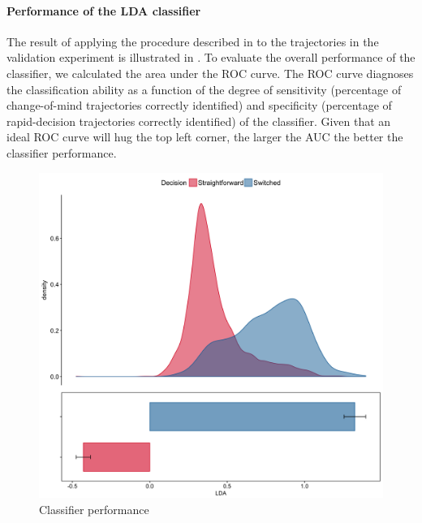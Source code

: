 \documentclass{article}
\begin{document}
\paragraph{Performance of the LDA classifier}
The result of applying the procedure described in  to the trajectories in the validation experiment is illustrated in . 
To evaluate the overall performance of the classifier, we calculated the area under the ROC curve.  
The ROC curve diagnoses the classification ability as a function of the degree of sensitivity (percentage of change-of-mind trajectories correctly identified) and specificity (percentage of rapid-decision trajectories correctly identified) of the classifier. Given that an ideal ROC curve will hug the top left corner, the larger the AUC the better the classifier performance. 

\begin{figure}
\centering
\includegraphics[width=\textwidth]{lda_distribution_calibration.png}
\caption{Classifier performance} \label{DIST:LDA}
\end{figure}
\end{document}
